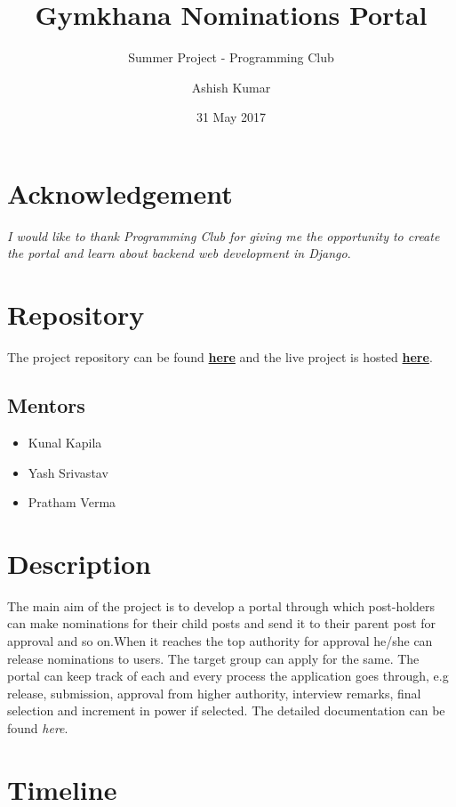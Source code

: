 \documentclass[12pt,a4paper]{scrartcl}
\title{\textbf{Gymkhana Nominations Portal}}
\subtitle{Summer Project - Programming Club}
\date{31 May 2017}
\author{Ashish Kumar}
\begin{document}
\maketitle

\section{Acknowledgement}
\textit{I would like to thank Programming Club for giving me the opportunity to create the portal and learn about backend web development in Django}.

\section{Repository}
The project repository can be found \textbf{\href{https://github.com/SummerCamp17/Gymkhana-Nominations}{here}} and the live project is hosted \textbf{\href{https://gymkhana.pythonanywhere.com}{here}}.

\subsection{Mentors}
\begin{itemize}
	\item Kunal Kapila
	\item Yash Srivastav
	\item Pratham Verma
\end{itemize}


\section{Description}
The main aim of the project is to develop a portal through which post-holders can make nominations for their child posts and send it to their parent post for approval and so on.When it reaches the top authority for approval he/she can release nominations to users. The target group can apply for the same. The portal can keep track of each and every process the application goes through, e.g release, submission, approval from higher authority, interview remarks, final selection and increment in power if selected. The detailed documentation can be found \textit{here}. 

\section{Timeline}
\end{document}
